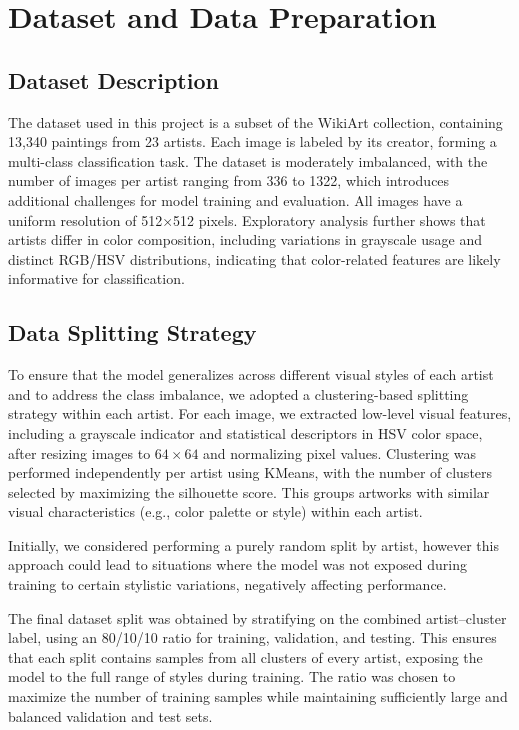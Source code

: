 \documentclass[12pt,a4paper]{article}
\begin{document}
\section{Dataset and Data Preparation}
\subsection{Dataset Description}

The dataset used in this project is a subset of the WikiArt collection, containing 13,340 paintings from 23 artists. 
Each image is labeled by its creator, forming a multi-class classification task. 
The dataset is moderately imbalanced, with the number of images per artist ranging from 336 to 1322, which introduces additional challenges for model training and evaluation.
All images have a uniform resolution of 512×512 pixels. 
Exploratory analysis further shows that artists differ in color composition, including variations in grayscale usage and distinct RGB/HSV distributions, indicating that color-related features are likely informative for classification.


\subsection{Data Splitting Strategy}

To ensure that the model generalizes across different visual styles of each artist and to address the class imbalance, we adopted a clustering-based splitting strategy within each artist. 
For each image, we extracted low-level visual features, including a grayscale indicator and statistical descriptors in HSV color space, after resizing images to $64 \times 64$ and normalizing pixel values.
Clustering was performed independently per artist using KMeans, with the number of clusters selected by maximizing the silhouette score. 
This groups artworks with similar visual characteristics (e.g., color palette or style) within each artist.

Initially, we considered performing a purely random split by artist, however this approach could lead to situations where the model was not exposed during training to
certain stylistic variations, negatively affecting performance.

The final dataset split was obtained by stratifying on the combined artist–cluster label, using an 80/10/10 ratio for training, validation, and testing. 
This ensures that each split contains samples from all clusters of every artist, exposing the model to the full range of styles during training.
The ratio was chosen to maximize the number of training samples while maintaining sufficiently large and balanced validation and test sets.
\end{document}
